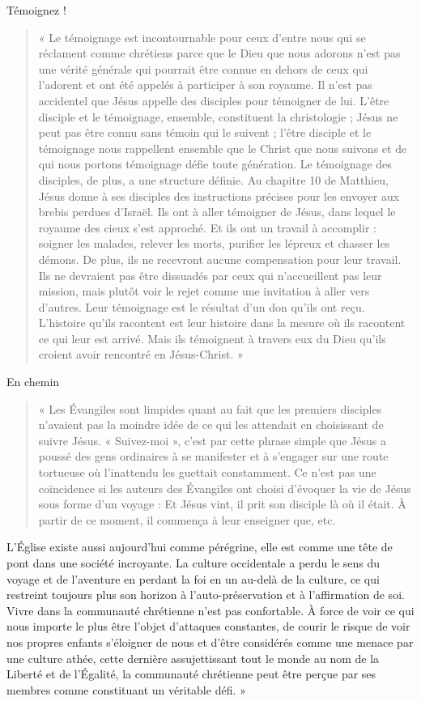 Témoignez !
\begin{quote}
    « Le témoignage est incontournable pour ceux d'entre nous qui se réclament comme chrétiens parce que le Dieu que nous adorons n'est pas une vérité générale qui pourrait être connue en dehors de ceux qui l'adorent et ont été appelés à participer à son royaume. Il n'est pas accidentel que Jésus appelle des disciples pour témoigner de lui. L'être disciple et le témoignage, ensemble, constituent la christologie ; Jésus ne peut pas être connu sans témoin qui le suivent ; l'être disciple et le témoignage nous rappellent ensemble que le Christ que nous suivons et de qui nous portons témoignage défie toute génération. Le témoignage des disciples, de plus, a une structure définie. 
Au chapitre 10 de Matthieu, Jésus donne à ses disciples des instructions précises pour les envoyer aux brebis perdues d'Israël. Ils ont à aller témoigner de Jésus, dans lequel le royaume des cieux s'est approché. Et ils ont un travail à accomplir : soigner les malades, relever les morts, purifier les lépreux et chasser les démons. De plus, ils ne recevront aucune compensation pour leur travail. Ils ne devraient pas être dissuadés par ceux qui n'accueillent pas leur mission, mais plutôt voir le rejet comme une invitation à aller vers d'autres. Leur témoignage est le résultat d'un don qu'ils ont reçu. L'histoire qu'ils racontent est leur histoire dans la mesure où ils racontent ce qui leur est arrivé. Mais ils témoignent à travers eux du Dieu qu'ils croient avoir rencontré en Jésus-Christ. »
\end{quote}


 

En chemin
\begin{quote}
   « Les Évangiles sont limpides quant au fait que les premiers disciples n'avaient pas la moindre idée de ce qui les attendait en choisissant de suivre Jésus.
« Suivez-moi », c'est par cette phrase simple que Jésus a poussé des gens ordinaires à se manifester et à s'engager sur une route tortueuse où l'inattendu les guettait constamment. Ce n'est pas une coïncidence si les auteurs des Évangiles ont choisi d'évoquer la vie de Jésus sous forme d'un voyage : Et Jésus vint, il prit son disciple là où il était. À partir de ce moment, il commença à leur enseigner que, etc. 
\end{quote}


L'Église existe aussi aujourd'hui comme pérégrine, elle est comme une tête de pont dans une société incroyante. La culture occidentale a perdu le sens du voyage et de l'aventure en perdant la foi en un au-delà de la culture, ce qui restreint toujours plus son horizon à l'auto-préservation et à l'affirmation de soi.
Vivre dans la communauté chrétienne n'est pas confortable. À force de voir ce qui nous importe le plus être l'objet d'attaques constantes, de courir le risque de voir nos propres enfants s'éloigner de nous et d'être considérés comme une menace par une culture athée, cette dernière assujettissant tout le monde au nom de la Liberté et de l'Égalité, la communauté chrétienne peut être perçue par ses membres comme constituant un véritable défi. »
 


